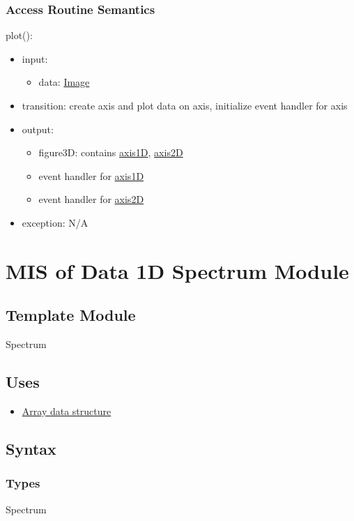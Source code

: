 \documentclass[12pt, titlepage]{article}
\begin{document}
\subsubsection{Access Routine Semantics}

\noindent plot():
\begin{itemize}
    \item input:
    \begin{itemize}
        \item data: \hyperref[Mod:Image]{Image}
    \end{itemize}
    \item transition: create axis and plot data on axis, initialize event
    handler for axis
    \item output:
    \begin{itemize}
        \item figure3D: contains \hyperref[Mod:Plotting]{axis1D},
        \hyperref[Mod:Plotting]{axis2D}
        \item event handler for \hyperref[Mod:Plotting]{axis1D}
        \item event handler for \hyperref[Mod:Plotting]{axis2D}
    \end{itemize}
    \item exception: N/A
\end{itemize}

\section{MIS of Data 1D Spectrum Module} \label{Mod:Spectrum}
\subsection{Template Module}
Spectrum

\subsection{Uses}
\begin{itemize}
    \item \hyperref[Mod:Array]{Array data structure}
\end{itemize}

\subsection{Syntax}

\subsubsection{Types}
Spectrum
\end{document}
